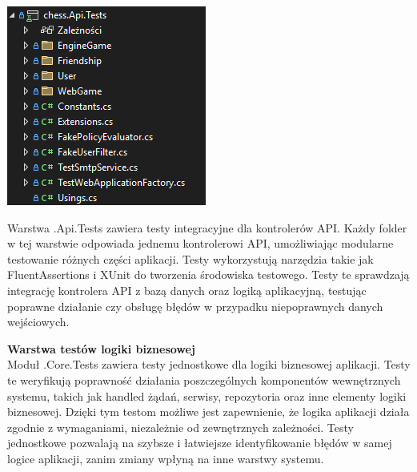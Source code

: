 \documentclass[12pt,a4paper]{article}
\begin{document}
\vspace{0.5cm}
\begin{minipage}[t]{0.45\textwidth}
    \vspace{0pt}
    \centering
    \includegraphics[width=\linewidth]{zdj/struktura_back_api_tests.png} 
\end{minipage}
\hfill
\begin{minipage}[t]{0.45\textwidth}
    \vspace{0pt}
    \raggedright
    Warstwa .Api.Tests zawiera testy integracyjne dla kontrolerów API. Każdy folder w tej warstwie odpowiada jednemu kontrolerowi API, umożliwiając modularne testowanie różnych części aplikacji. Testy wykorzystują narzędzia takie jak FluentAssertions i XUnit do tworzenia środowiska testowego. Testy te sprawdzają integrację kontrolera API z bazą danych oraz logiką aplikacyjną, testując poprawne działanie czy obsługę błędów w przypadku niepoprawnych danych wejściowych.
\end{minipage}
\vspace{0.5cm}

\textbf{Warstwa testów logiki biznesowej}\\
Moduł .Core.Tests zawiera testy jednostkowe dla logiki biznesowej aplikacji. Testy te weryfikują poprawność działania poszczególnych komponentów wewnętrznych systemu, takich jak handled żądań, serwisy, repozytoria oraz inne elementy logiki biznesowej. Dzięki tym testom możliwe jest zapewnienie, że logika aplikacji działa zgodnie z wymaganiami, niezależnie od zewnętrznych zależności. Testy jednostkowe pozwalają na szybsze i łatwiejsze identyfikowanie błędów w samej logice aplikacji, zanim zmiany wpłyną na inne warstwy systemu.
\end{document}
